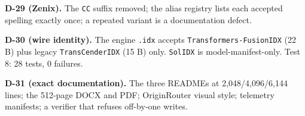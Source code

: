 \textbf{D-29 (Zenix).} The \texttt{CC} suffix removed; the alias registry lists each accepted
spelling exactly once; a repeated variant is a documentation defect.

\textbf{D-30 (wire identity).} The engine \texttt{.idx} accepts
\texttt{Transformers-FusionIDX} (22 B) plus legacy \texttt{TransCenderIDX} (15 B) only.
\texttt{SolIDX} is model-manifest-only. Test 8: 28 tests, 0 failures.

\textbf{D-31 (exact documentation).} The three READMEs at 2{,}048/4{,}096/6{,}144 lines; the
512-page DOCX and PDF; OriginRouter visual style; telemetry manifests; a verifier that refuses
off-by-one writes.
